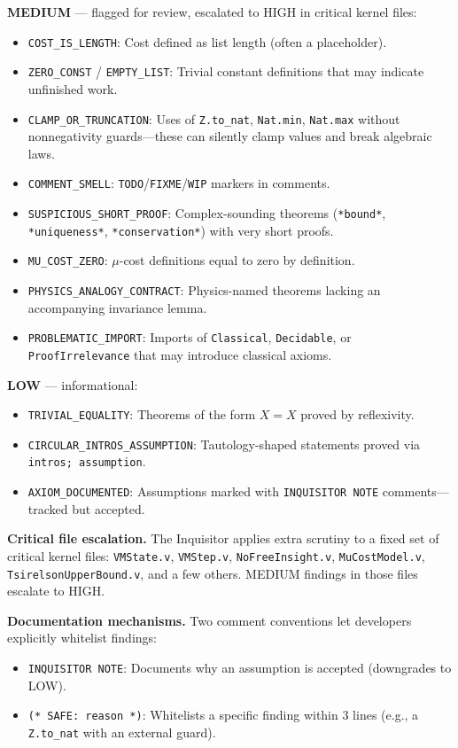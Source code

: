 \textbf{MEDIUM} --- flagged for review, escalated to HIGH in critical kernel files:
\begin{itemize}
    \item \texttt{COST\_IS\_LENGTH}: Cost defined as list length (often a placeholder).
    \item \texttt{ZERO\_CONST} / \texttt{EMPTY\_LIST}: Trivial constant definitions that may indicate unfinished work.
    \item \texttt{CLAMP\_OR\_TRUNCATION}: Uses of \texttt{Z.to\_nat}, \texttt{Nat.min}, \texttt{Nat.max} without nonnegativity guards---these can silently clamp values and break algebraic laws.
    \item \texttt{COMMENT\_SMELL}: \texttt{TODO}/\texttt{FIXME}/\texttt{WIP} markers in comments.
    \item \texttt{SUSPICIOUS\_SHORT\_PROOF}: Complex-sounding theorems (\texttt{*bound*}, \texttt{*uniqueness*}, \texttt{*conservation*}) with very short proofs.
    \item \texttt{MU\_COST\_ZERO}: $\mu$-cost definitions equal to zero by definition.
    \item \texttt{PHYSICS\_ANALOGY\_CONTRACT}: Physics-named theorems lacking an accompanying invariance lemma.
    \item \texttt{PROBLEMATIC\_IMPORT}: Imports of \texttt{Classical}, \texttt{Decidable}, or \texttt{ProofIrrelevance} that may introduce classical axioms.
\end{itemize}

\textbf{LOW} --- informational:
\begin{itemize}
    \item \texttt{TRIVIAL\_EQUALITY}: Theorems of the form $X = X$ proved by reflexivity.
    \item \texttt{CIRCULAR\_INTROS\_ASSUMPTION}: Tautology-shaped statements proved via \texttt{intros; assumption}.
    \item \texttt{AXIOM\_DOCUMENTED}: Assumptions marked with \texttt{INQUISITOR NOTE} comments---tracked but accepted.
\end{itemize}

\textbf{Critical file escalation.} The Inquisitor applies extra scrutiny to a fixed set of critical kernel files: \texttt{VMState.v}, \texttt{VMStep.v}, \texttt{NoFreeInsight.v}, \texttt{MuCostModel.v}, \texttt{TsirelsonUpperBound.v}, and a few others. MEDIUM findings in those files escalate to HIGH.

\textbf{Documentation mechanisms.} Two comment conventions let developers explicitly whitelist findings:
\begin{itemize}
    \item \texttt{INQUISITOR NOTE}: Documents why an assumption is accepted (downgrades to LOW).
    \item \texttt{(* SAFE: reason *)}: Whitelists a specific finding within 3 lines (e.g., a \texttt{Z.to\_nat} with an external guard).
\end{itemize}

